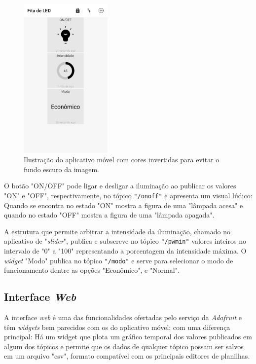 \begin{figure}[ht]
    \begin{center}
    \includegraphics[width=0.4\textwidth]{figuras/appdash.png}
    \end{center}
    \caption[Ilustração do aplicativo móvel.]{Ilustração do aplicativo móvel com cores invertidas para evitar o fundo escuro da imagem.}
    \label{appdash}
\end{figure}

O botão "ON/OFF" pode ligar e desligar a iluminação ao publicar os valores "ON" e "OFF", respectivamente, no tópico \texttt{"/onoff"} e apresenta um visual lúdico: Quando se encontra no estado "ON" mostra a figura de uma "lâmpada acesa" e quando no estado "OFF" mostra a figura de uma "lâmpada apagada". 

A estrutura que permite arbitrar a intensidade da iluminação, chamado no aplicativo de "\textit{slider}", publica e subscreve no tópico \texttt{"/pwmin"} valores inteiros no intervalo de "0" a "100" representando a porcentagem da intensidade máxima. O \textit{widget} "Modo" publica no tópico \texttt{"/modo"} e serve para selecionar o modo de funcionamento dentre as opções "Econômico", e "Normal". 

\subsection{Interface \textit{Web}}

A interface \textit{web} é uma das funcionalidades ofertadas pelo serviço da \textit{Adafruit} e têm \textit{widgets} bem parecidos com os do aplicativo móvel; com uma diferença principal: Há um widget que plota um gráfico temporal dos valores publicados em algum dos tópicos e permite que os dados de qualquer tópico possam ser salvos em um arquivo "csv", formato compatível com os principais editores de planilhas.

